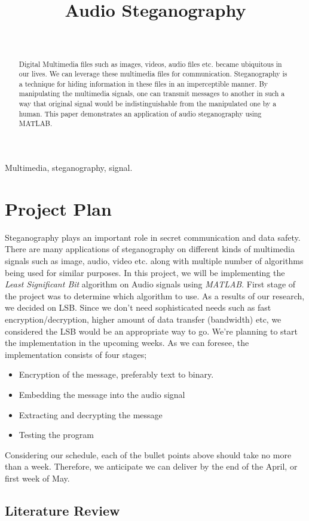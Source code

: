 \documentclass[twocolumns]{IEEEtran}
\author{
	\IEEEauthorblockN{Erdal Sidal Dogan, Mert Komurcuoglu, Berkay Kurkcu} \\
	\IEEEauthorblockA{Facult of Engineering, MEF University \\
		Electrical \& Electronics Engineering Department}
}
\title{Audio Steganography}
\begin{document}
	\maketitle
	\begin{abstract}
		Digital Multimedia files such as images, videos, audio files etc. became ubiquitous in our lives. We can leverage these multimedia files for communication. Steganography is a technique for hiding information in these files in an imperceptible manner. By manipulating the multimedia signals, one can transmit messages to another in such a way that original signal would be indistinguishable from the manipulated one by a human. This paper demonstrates an application of audio steganography using MATLAB.
	\end{abstract}
	\begin{IEEEkeywords}
		Multimedia, steganography, signal.
	\end{IEEEkeywords}
	\section{Project Plan}
	Steganography plays an important role in secret communication and data safety. There are many applications of steganography on different kinds of multimedia signals such as image, audio, video etc. along with multiple number of algorithms being used for similar purposes. In this project, we will be implementing the \textit{Least Significant Bit} algorithm on Audio signals using \textit{MATLAB}. First stage of the project was to determine which algorithm to use. As a results of our research, we decided on LSB. Since we don't need sophisticated needs such as fast encryption/decryption, higher amount of data transfer (bandwidth) etc, we considered the LSB would be an appropriate way to go. We're planning to start the implementation in the upcoming weeks. As we can foresee, the implementation consists of four stages;
	\begin{itemize}
		\item Encryption of the message, preferably text to binary.
		\item Embedding the message into the audio signal
		\item Extracting and decrypting the message
		\item Testing the program
	\end{itemize}
	Considering our schedule, each of the bullet points above should take no more than a week. Therefore, we anticipate we can deliver by the end of the April, or first week of May.
	
	\subsection{Literature Review}
\end{document}
